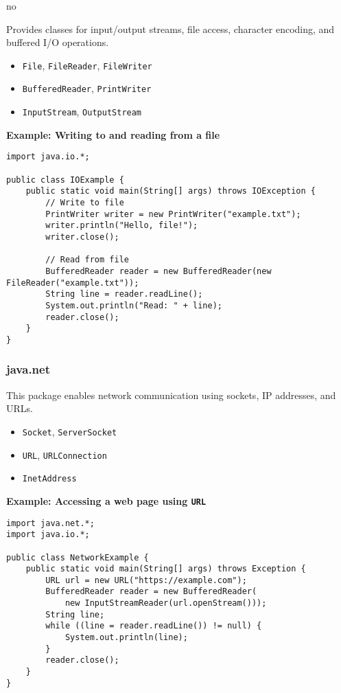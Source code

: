 no\documentclass{article}
\begin{document}
Provides classes for input/output streams, file access, character encoding, and buffered I/O operations.

\begin{itemize}
    \item \texttt{File}, \texttt{FileReader}, \texttt{FileWriter}
    \item \texttt{BufferedReader}, \texttt{PrintWriter}
    \item \texttt{InputStream}, \texttt{OutputStream}
\end{itemize}

\noindent\textbf{Example: Writing to and reading from a file}
\begin{verbatim}
import java.io.*;

public class IOExample {
    public static void main(String[] args) throws IOException {
        // Write to file
        PrintWriter writer = new PrintWriter("example.txt");
        writer.println("Hello, file!");
        writer.close();

        // Read from file
        BufferedReader reader = new BufferedReader(new FileReader("example.txt"));
        String line = reader.readLine();
        System.out.println("Read: " + line);
        reader.close();
    }
}
\end{verbatim}

\subsubsection*{java.net}

This package enables network communication using sockets, IP addresses, and URLs.

\begin{itemize}
    \item \texttt{Socket}, \texttt{ServerSocket}
    \item \texttt{URL}, \texttt{URLConnection}
    \item \texttt{InetAddress}
\end{itemize}

\noindent\textbf{Example: Accessing a web page using \texttt{URL}}
\begin{verbatim}
import java.net.*;
import java.io.*;

public class NetworkExample {
    public static void main(String[] args) throws Exception {
        URL url = new URL("https://example.com");
        BufferedReader reader = new BufferedReader(
            new InputStreamReader(url.openStream()));
        String line;
        while ((line = reader.readLine()) != null) {
            System.out.println(line);
        }
        reader.close();
    }
}
\end{verbatim}
\end{document}
